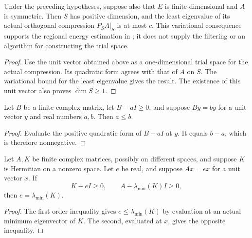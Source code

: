 \begin{lemma}
    \label{lem:tensor_local_compressed_minimum}
    \leanok
    Under the preceding hypotheses, suppose also that $E$ is
    finite-dimensional and $A$ is symmetric. Then $S$ has positive
    dimension, and the least eigenvalue of its actual orthogonal
    compression $P_SA|_S$ is at most $c$.
    This variational consequence supports the regional energy
    estimation in \cite[Figure~\texttt{fig:algo1}, line 1631, and
        lines 1793--1807]{Arad2016RigorousRG}; it does not supply the
    filtering or an algorithm for constructing the trial space.
\end{lemma}
\begin{proof}\leanok
    Use the unit vector obtained above as a one-dimensional trial space
    for the actual compression. Its quadratic form agrees with that
    of $A$ on $S$. The variational bound for the least eigenvalue gives
    the result. The existence of this unit vector also proves
    $\dim S\ge1$.
\end{proof}


\begin{lemma}
    \label{lem:positive_shift_eigenvalue_lower}
    \leanok
    Let $B$ be a finite complex matrix, let $B-aI\ge0$, and suppose
    $By=by$ for a unit vector $y$ and real numbers $a,b$. Then $a\le b$.
\end{lemma}
\begin{proof}\leanok
    Evaluate the positive quadratic form of $B-aI$ at $y$. It equals
    $b-a$, which is therefore nonnegative.
\end{proof}

\begin{lemma}
    \label{lem:attained_energy_native_minimum}
    \leanok
    Let $A,K$ be finite complex matrices, possibly on different spaces,
    and suppose $K$ is Hermitian on a nonzero space. Let $e$ be real,
    and suppose $Ax=ex$ for a unit vector $x$. If
    \[
        K-eI\ge0,\qquad A-\lambda_{\min}(K)I\ge0,
    \]
    then $e=\lambda_{\min}(K)$.
\end{lemma}
\begin{proof}\leanok
    The first order inequality gives $e\le\lambda_{\min}(K)$ by
    evaluation at an actual minimum eigenvector of $K$. The second,
    evaluated at $x$, gives the opposite inequality.
\end{proof}

